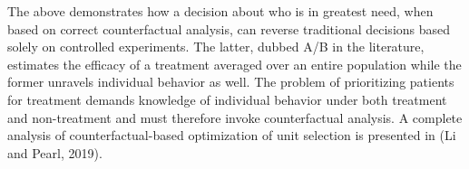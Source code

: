 \documentclass{article}
\begin{document}
The above demonstrates how a decision about who is in greatest need, when based on correct counterfactual analysis, can reverse traditional decisions based solely on controlled experiments. The latter, dubbed A/B in the literature, estimates the efficacy of a treatment averaged over an entire population while the former unravels individual behavior as well. The problem of prioritizing patients for treatment demands knowledge of individual behavior under both treatment and non-treatment and must therefore invoke counterfactual analysis. A complete analysis of counterfactual-based optimization of unit selection is presented in (Li and Pearl, 2019\citep{lipearl2019}).



\end{document}
